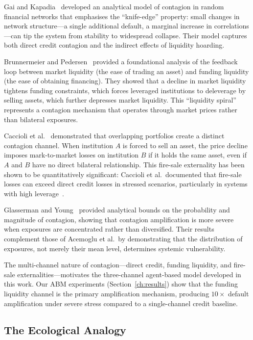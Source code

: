 Gai and Kapadia~\cite{gai2010contagion} developed an analytical model of
contagion in random financial networks that emphasises the ``knife-edge''
property: small changes in network structure---a single additional
default, a marginal increase in correlations---can tip the system from
stability to widespread collapse.  Their model captures both direct
credit contagion and the indirect effects of liquidity hoarding.

Brunnermeier and Pedersen~\cite{brunnermeier2009market} provided a
foundational analysis of the feedback loop between market liquidity
(the ease of trading an asset) and funding liquidity (the ease of
obtaining financing).  They showed that a decline in market liquidity
tightens funding constraints, which forces leveraged institutions to
deleverage by selling assets, which further depresses market liquidity.
This ``liquidity spiral'' represents a contagion mechanism that operates
through market prices rather than bilateral exposures.

Caccioli et al.~\cite{caccioli2015overlapping} demonstrated that
overlapping portfolios create a distinct contagion channel.  When
institution $A$ is forced to sell an asset, the price decline imposes
mark-to-market losses on institution $B$ if it holds the same asset,
even if $A$ and $B$ have no direct bilateral relationship.  This
fire-sale externality has been shown to be quantitatively significant:
Caccioli et al.\ documented that fire-sale losses can exceed direct
credit losses in stressed scenarios, particularly in systems with high
leverage~\cite{caccioli2009eroding}.

Glasserman and Young~\cite{glasserman2015contagion} provided analytical
bounds on the probability and magnitude of contagion, showing that
contagion amplification is more severe when exposures are concentrated
rather than diversified.  Their results complement those of Acemoglu et
al.\ by demonstrating that the distribution of exposures, not merely
their mean level, determines systemic vulnerability.

The multi-channel nature of contagion---direct credit, funding liquidity,
and fire-sale externalities---motivates the three-channel agent-based
model developed in this work.  Our ABM experiments
(Section~\ref{ch:results}) show that the funding liquidity channel is
the primary amplification mechanism, producing $10\times$ default
amplification under severe stress compared to a single-channel credit
baseline.

\subsection{The Ecological Analogy}
\label{sec:ecology}


